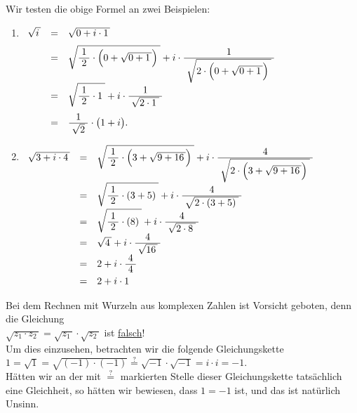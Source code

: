 \examples
Wir testen die obige Formel  an zwei Beispielen:
\begin{enumerate}
\item $
       \begin{array}[t]{lcl}
       \sqrt{i\,} & = & \sqrt{0 + i \cdot 1\,} \\[0.2cm]
                  & = & \sqrt{\bruch{1}{2} \cdot \Bigl(0 + \sqrt{0 + 1\,}\Bigr)\;} + 
                         i \cdot \bruch{1}{\sqrt{2\cdot \Bigl(0 + \sqrt{0 + 1\,}\Bigr)\;}}    \\[0.2cm]
                  & = & \sqrt{\bruch{1}{2} \cdot 1\;} + i \cdot \bruch{1}{\sqrt{2\cdot 1\;}} \\[0.4cm]
                  & = & \bruch{1}{\sqrt{2}} \cdot \bigl(1 + i\bigr).
       \end{array}
       $
\item $
       \begin{array}[t]{lcl}
             \sqrt{3 + i \cdot 4\,}
       & = & \sqrt{\bruch{1}{2} \cdot \Bigl(3 + \sqrt{9 + 16\,}\Bigr)\;} + 
             i \cdot \bruch{4}{\sqrt{2\cdot \Bigl(3 + \sqrt{9 + 16\,}\Bigr)\;}}    \\[0.2cm]
       & = & \sqrt{\bruch{1}{2} \cdot (3 + 5)\;} + i \cdot \bruch{4}{\sqrt{2\cdot (3 + 5)\;}}     \\[0.2cm]
       & = & \sqrt{\bruch{1}{2} \cdot (8)\;} + i \cdot \bruch{4}{\sqrt{2\cdot 8\;}}     \\[0.2cm]
       & = & \sqrt{4\,} + i \cdot \bruch{4}{\sqrt{16\,}}     \\[0.2cm]
       & = & 2 + i \cdot \bruch{4}{4}     \\[0.2cm]
       & = & 2 + i \cdot 1
       \end{array}
       $
\end{enumerate}

\remark
Bei dem Rechnen mit Wurzeln aus komplexen Zahlen ist Vorsicht geboten, denn die Gleichung 
\\[0.2cm]
\hspace*{1.3cm}
$\sqrt{z_1 \cdot z_2\,} = \sqrt{z_1\,} \cdot \sqrt{z_2\,}$  \quad ist \underline{falsch}!
\\[0.2cm]
Um dies einzusehen, betrachten wir die folgende Gleichungskette
\\[0.2cm]
\hspace*{1.3cm}
$1 = \sqrt{1} = \sqrt{(-1) \cdot (-1)} \stackrel{?}{=} \sqrt{-1} \cdot \sqrt{-1} = i \cdot i = -1$.
\\[0.2cm]
Hätten wir an der mit $\stackrel{?}{=}$ markierten Stelle dieser Gleichungskette tatsächlich eine
Gleichheit, so hätten wir bewiesen, dass $1 = -1$ ist, und das ist natürlich Unsinn.

